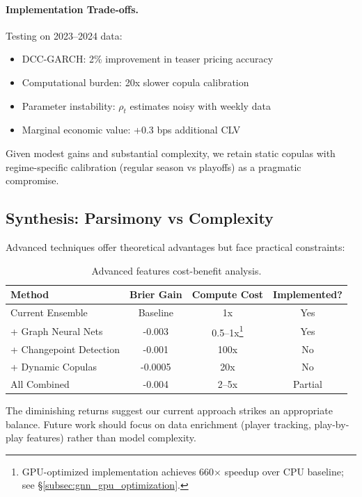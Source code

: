\paragraph{Implementation Trade-offs.}
Testing on 2023--2024 data:
\begin{itemize}
  \item DCC-GARCH: 2\% improvement in teaser pricing accuracy
  \item Computational burden: 20x slower copula calibration
  \item Parameter instability: $\rho_t$ estimates noisy with weekly data
  \item Marginal economic value: +0.3 bps additional CLV
\end{itemize}

Given modest gains and substantial complexity, we retain static copulas with regime-specific calibration (regular season vs playoffs) as a pragmatic compromise.

\subsection{Synthesis: Parsimony vs Complexity}

Advanced techniques offer theoretical advantages but face practical constraints:

\begin{table}[!ht]
  \centering
  \small
  \caption{Advanced features cost-benefit analysis.}
  \begin{tabular}{lccc}
    \toprule
    \textbf{Method}  & \textbf{Brier Gain}  & \textbf{Compute Cost}  & \textbf{Implemented?} \\
    \midrule
    Current Ensemble & Baseline & 1x & Yes \\
    + Graph Neural Nets & -0.003 & 0.5--1x\footnote{GPU-optimized implementation achieves 660$\times$ speedup over CPU baseline; see \S\ref{subsec:gnn_gpu_optimization}.} & Yes \\
    + Changepoint Detection & -0.001 & 100x & No \\
    + Dynamic Copulas & -0.0005 & 20x & No \\
    All Combined & -0.004 & 2--5x & Partial \\
    \bottomrule
  \end{tabular}
\end{table}

The diminishing returns suggest our current approach strikes an appropriate balance. Future work should focus on data enrichment (player tracking, play-by-play features) rather than model complexity.

